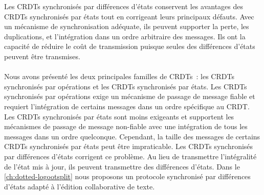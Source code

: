 Les \acp{CRDT} synchronisés par différences d'états conservent les avantages des \acp{CRDT} synchronisés par états tout en corrigeant leurs principaux défauts.
Avec un mécanisme de synchronisation adéquate, ils peuvent supporter la perte, les duplications, et l'intégration dans un ordre arbitraire des messages.
Ils ont la capacité de réduire le coût de transmission puisque seules des différences d'états peuvent être transmises.


\paragraph{} Nous avons présenté les deux principales familles de \acp{CRDT}~: les \acp{CRDT} synchronisés par opérations et les \acp{CRDT} synchronisés par états.
Les \acp{CRDT} synchronisés par opérations exige un mécanisme de passage de message fiable et requiert l'intégration de certains messages dans un ordre spécifique au \ac{CRDT}.
Les \acp{CRDT} synchronisés par états sont moins exigeants et supportent les mécanismes de passage de message non-fiable avec une intégration de tous les messages dans un ordre quelconque.
Cependant, la taille des messages de certains \acp{CRDT} synchronisés par états peut être impraticable.
Les \acp{CRDT} synchronisés par différences d'états corrigent ce problème.
Au lieu de transmettre l'intégralité de l'état mis à jour, ils peuvent transmettre des différences d'états.
Dans le \autoref{ch:dotted-logootsplit} nous proposons un protocole synchronisé par différences d'états adapté à l'édition collaborative de texte.
